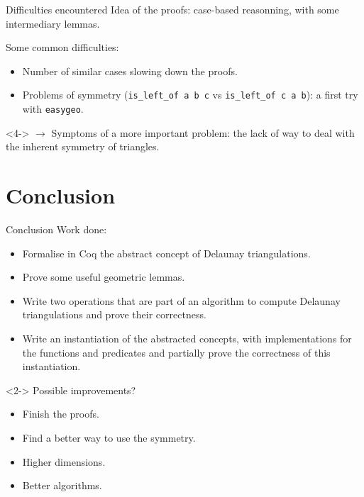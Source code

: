 \documentclass[18pt]{beamer}
\begin{document}
\begin{frame}{Difficulties encountered}
Idea of the proofs: case-based reasonning, with some intermediary lemmas.

Some common difficulties:
\begin{itemize}
 \item<2-> Number of similar cases slowing down the proofs.
 \item<3-> Problems of symmetry ({\tt is\_left\_of a b c} vs {\tt is\_left\_of c a b}): a first try with {\tt easygeo}.
\end{itemize}

\begin{uncoverenv}<4->
$\rightarrow$ Symptoms of a more important problem: the lack of way to deal with the inherent symmetry of triangles.
\end{uncoverenv}


\end{frame}


\section{Conclusion}
\begin{frame}{Conclusion}
Work done:
\begin{itemize}
 \item Formalise in Coq the abstract concept of Delaunay triangulations.
 \item Prove some useful geometric lemmas.
 \item Write two operations that are part of an algorithm to compute Delaunay triangulations and prove their correctness.
 \item Write an instantiation of the abstracted concepts, with implementations for the functions and predicates and partially prove the correctness of this instantiation.
 \end{itemize}

\begin{uncoverenv}<2->
Possible improvements?
\begin{itemize}
 \item Finish the proofs.
 \item Find a better way to use the symmetry.
 \item Higher dimensions.
 \item Better algorithms.
\end{itemize}
\end{uncoverenv}

\end{frame}
\end{document}
